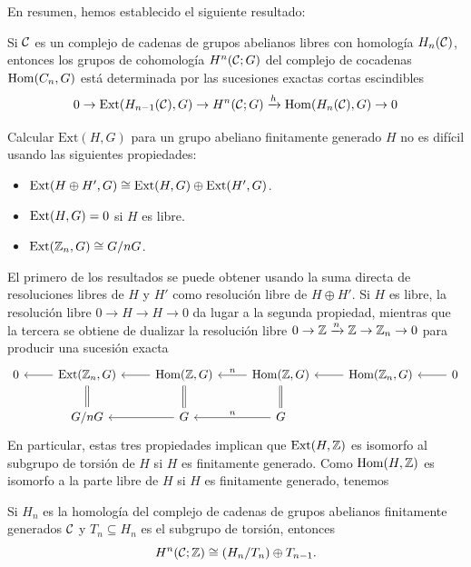 \documentclass[TA.tex]{subfiles}
\begin{document}
En resumen, hemos establecido el siguiente resultado:
\begin{teorema}
Si $\mathcal{C}$ es un complejo de cadenas de grupos abelianos libres con homología $H_n(\mathcal{C})$, entonces los grupos de cohomología $H^n(\mathcal{C};G)$ del complejo de cocadenas $\operatorname{Hom}(C_n,G)$ está determinada por las sucesiones exactas cortas escindibles
\[
0\to \mathrm{Ext}(H_{n-1}(\mathcal{C}),G)\to H^n(\mathcal{C};G)\xrightarrow{h}\operatorname{Hom}(H_n(\mathcal{C}),G)\to 0
\]

Calcular $\mathrm{Ext}(H,G)$ para un grupo abeliano finitamente generado $H$ no es difícil usando las siguientes propiedades:
\begin{itemize}
\item $\operatorname{Ext}(H\oplus H',G)\cong\operatorname{Ext}(H,G)\oplus\operatorname{Ext}(H',G)$.
\item $\operatorname{Ext}(H,G)=0$ si $H$ es libre.
\item $\operatorname{Ext}(\mathbb{Z}_n,G)\cong G/nG$.
\end{itemize}
\end{teorema}
El primero de los resultados se puede obtener usando la suma directa de resoluciones libres de $H$ y $H'$ como resolución libre de $H\oplus H'$. Si $H$ es libre, la resolución libre $0\to H\to H\to 0$ da lugar a la segunda propiedad, mientras que la tercera se obtiene de dualizar la resolución libre $0\to\mathbb{Z}\xrightarrow{n}\mathbb{Z}\to\mathbb{Z}_n\to 0$ para producir una sucesión exacta
\[
\begin{tikzcd}
0 & \Ext(\Z_n,G)\arrow[l]\arrow[d,equals] & \Hom(\Z,G)\arrow[l]\arrow[d, equals] &\Hom(\Z,G)\arrow[l, "n"' ] & \Hom(\Z_n,G)\arrow[l] & 0\arrow[l]\\
& G/nG &G\arrow[l] & G\arrow[l, "n"']\arrow[u, equals]
\end{tikzcd}
\]
En particular, estas tres propiedades implican que $\operatorname{Ext}(H,\mathbb{Z})$ es isomorfo al subgrupo de torsión de $H$ si $H$ es finitamente generado. Como $\operatorname{Hom}(H,\mathbb{Z})$ es isomorfo a la parte libre de $H$ si $H$ es finitamente generado, tenemos
\begin{coro}\label{3.3}
Si $H_n$ es la homología del complejo de cadenas de grupos abelianos finitamente generados $\mathcal{C}$ y $T_n\subseteq H_n$ es el subgrupo de torsión, entonces
\[
H^n(\mathcal{C};\mathbb{Z})\cong (H_n/T_n)\oplus T_{n-1}.
\]
\end{coro} 
\end{document}
